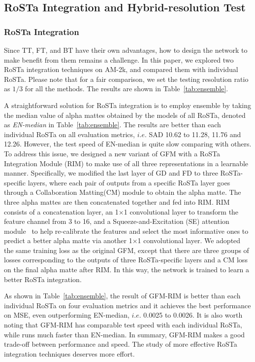 \documentclass[twocolumn]{svjour3}
\begin{document}
\subsection{RoSTa Integration and Hybrid-resolution Test}

\subsubsection{RoSTa Integration}

Since TT, FT, and BT have their own advantages, how to design the network to make benefit from them remains a challenge. In this paper, we explored two RoSTa integration techniques on AM-2k, and compared them with individual RoSTa. Please note that for a fair comparison, we set the testing resolution ratio as $1/3$ for all the methods. The results are shown in Table~\ref{tab:ensemble}.

A straightforward solution for RoSTa integration is to employ ensemble by taking the median value of alpha mattes obtained by the models of all RoSTa, denoted as \textit{EN-median} in Table~\ref{tab:ensemble}. The results are better than each individual RoSTa on all evaluation metrics, $i.e.$ SAD 10.62 to 11.28, 11.76 and 12.26. However, the test speed of EN-median is quite slow comparing with others. To address this issue, we designed a new variant of GFM with a RoSTa Integration Module (RIM) to make use of all three representations in a learnable manner. Specifically, we modified the last layer of GD and FD to three RoSTa-specific layers, where each pair of outputs from a specific RoSTa layer goes through a Collaboration Matting(CM) module to obtain the alpha matte. The three alpha mattes are then concatenated together and fed into RIM. RIM consists of a concatenation layer, an 1$\times$1 convolutional layer to transform the feature channel from 3 to 16, and a Squeeze-and-Excitation (SE) attention module~\citep{hu2018squeeze} to help re-calibrate the features and select the most informative ones to predict a better alpha matte via another 1$\times$1 convolutional layer. We adopted the same training loss as the original GFM, except that there are three groups of losses corresponding to the outputs of three RoSTa-specific layers and a CM loss on the final alpha matte after RIM. In this way, the network is trained to learn a better RoSTa integration.

As shown in Table~\ref{tab:ensemble}, the result of GFM-RIM is better than each individual RoSTa on four evaluation metrics and it achieves the best performance on MSE, even outperforming EN-median, $i.e.$ 0.0025 to 0.0026. It is also worth noting that GFM-RIM has comparable test speed with each individual RoSTa, while runs much faster than EN-median. In summary, GFM-RIM makes a good trade-off between performance and speed. The study of more effective RoSTa integration techniques deserves more effort.
\end{document}
